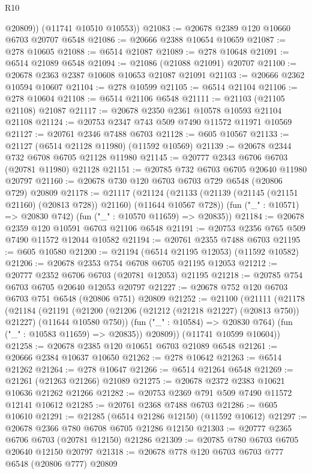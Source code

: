 \begin{lexlean}{R10}
\begin{coremodule}
          @20809))
      (@11741 @10510 @10553))
@21083 := @20678 @2389 @120 @10660 @6703 @20707 @6548
@21086 := @20666 @2388 @10654 @10659
@21087 := @278 @10605
@21088 := @6514 @21087
@21089 := @278 @10648
@21091 := @6514 @21089 @6548
@21094 := @21086 (@21088 @21091) @20707
@21100 := @20678 @2363 @2387 @10608 @10653 @21087 @21091
@21103 := @20666 @2362 @10594 @10607
@21104 := @278 @10599
@21105 := @6514 @21104
@21106 := @278 @10604
@21108 := @6514 @21106 @6548
@21111 := @21103 (@21105 @21108) @21087
@21117 := @20678 @2350 @2361 @10578 @10593 @21104 @21108
@21124 := @20753 @2347 @743 @509 @7490 @11572 @11971 @10569
@21127 := @20761 @2346 @7488 @6703
@21128 := @605 @10567
@21133 := @21127 (@6514 @21128 @11980) (@11592 @10569)
@21139 := @20678 @2344 @732 @6708 @6705 @21128 @11980
@21145 := @20777 @2343 @6706 @6703 (@20781 @11980) @21128
@21151 := @20785 @732 @6703 @6705 @20640 @11980 @20797
@21160 := @20678 @730 @120 @6703 @6703 @729 @6548 (@20806 @729) @20809
@21178 := @21117
    (@21124
      (@21133 (@21139 (@21145 (@21151 @21160) (@20813 @728)) @21160) (@11644 @10567 @728))
      (fun ("_" : @10571) => @20830 @742)
      (fun ("_" : @10570 @11659) => @20835))
@21184 := @20678 @2359 @120 @10591 @6703 @21106 @6548
@21191 := @20753 @2356 @765 @509 @7490 @11572 @12044 @10582
@21194 := @20761 @2355 @7488 @6703
@21195 := @605 @10580
@21200 := @21194 (@6514 @21195 @12053) (@11592 @10582)
@21206 := @20678 @2353 @754 @6708 @6705 @21195 @12053
@21212 := @20777 @2352 @6706 @6703 (@20781 @12053) @21195
@21218 := @20785 @754 @6703 @6705 @20640 @12053 @20797
@21227 := @20678 @752 @120 @6703 @6703 @751 @6548 (@20806 @751) @20809
@21252 := @21100
    (@21111
      (@21178
        (@21184
          (@21191
            (@21200 (@21206 (@21212 (@21218 @21227) (@20813 @750)) @21227) (@11644 @10580 @750))
            (fun ("_" : @10584) => @20830 @764)
            (fun ("_" : @10583 @11659) => @20835))
          @20809))
      (@11741 @10599 @10604))
@21258 := @20678 @2385 @120 @10651 @6703 @21089 @6548
@21261 := @20666 @2384 @10637 @10650
@21262 := @278 @10642
@21263 := @6514 @21262
@21264 := @278 @10647
@21266 := @6514 @21264 @6548
@21269 := @21261 (@21263 @21266) @21089
@21275 := @20678 @2372 @2383 @10621 @10636 @21262 @21266
@21282 := @20753 @2369 @791 @509 @7490 @11572 @12141 @10612
@21285 := @20761 @2368 @7488 @6703
@21286 := @605 @10610
@21291 := @21285 (@6514 @21286 @12150) (@11592 @10612)
@21297 := @20678 @2366 @780 @6708 @6705 @21286 @12150
@21303 := @20777 @2365 @6706 @6703 (@20781 @12150) @21286
@21309 := @20785 @780 @6703 @6705 @20640 @12150 @20797
@21318 := @20678 @778 @120 @6703 @6703 @777 @6548 (@20806 @777) @20809

\end{coremodule}
\end{lexlean}
